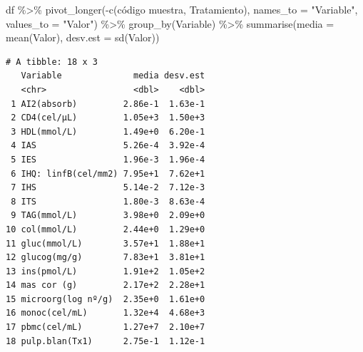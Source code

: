 \documentclass[
  a4paper,
]{scrreport}
\newenvironment{Shaded}{\begin{snugshade}}{\end{snugshade}}
\newcommand{\AttributeTok}[1]{\textcolor[rgb]{0.40,0.45,0.13}{#1}}
\newcommand{\FunctionTok}[1]{\textcolor[rgb]{0.28,0.35,0.67}{#1}}
\newcommand{\NormalTok}[1]{\textcolor[rgb]{0.00,0.23,0.31}{#1}}
\newcommand{\SpecialCharTok}[1]{\textcolor[rgb]{0.37,0.37,0.37}{#1}}
\newcommand{\StringTok}[1]{\textcolor[rgb]{0.13,0.47,0.30}{#1}}
\theoremstyle{definition}
\theoremstyle{definition}
\theoremstyle{remark}
\begin{document}
\begin{tcolorbox}[enhanced jigsaw, colbacktitle=quarto-callout-note-color!10!white, breakable, opacitybacktitle=0.6, left=2mm, opacityback=0, leftrule=.75mm, colframe=quarto-callout-note-color-frame, bottomrule=.15mm, toprule=.15mm, toptitle=1mm, colback=white, titlerule=0mm, title=\textcolor{quarto-callout-note-color}{\faInfo}\hspace{0.5em}{Solución}, rightrule=.15mm, arc=.35mm, bottomtitle=1mm, coltitle=black]

\begin{Shaded}
\begin{Highlighting}[]
\NormalTok{df }\SpecialCharTok{\%\textgreater{}\%}
    \FunctionTok{pivot\_longer}\NormalTok{(}\SpecialCharTok{{-}}\FunctionTok{c}\NormalTok{(}\StringTok{\textasciigrave{}}\AttributeTok{código muestra}\StringTok{\textasciigrave{}}\NormalTok{, Tratamiento), }\AttributeTok{names\_to =} \StringTok{"Variable"}\NormalTok{, }\AttributeTok{values\_to =} \StringTok{"Valor"}\NormalTok{) }\SpecialCharTok{\%\textgreater{}\%}
    \FunctionTok{group\_by}\NormalTok{(Variable) }\SpecialCharTok{\%\textgreater{}\%}
    \FunctionTok{summarise}\NormalTok{(}\AttributeTok{media =} \FunctionTok{mean}\NormalTok{(Valor), }\AttributeTok{desv.est =} \FunctionTok{sd}\NormalTok{(Valor))}
\end{Highlighting}
\end{Shaded}

\begin{verbatim}
# A tibble: 18 x 3
   Variable              media desv.est
   <chr>                 <dbl>    <dbl>
 1 AI2(absorb)         2.86e-1  1.63e-1
 2 CD4(cel/µL)         1.05e+3  1.50e+3
 3 HDL(mmol/L)         1.49e+0  6.20e-1
 4 IAS                 5.26e-4  3.92e-4
 5 IES                 1.96e-3  1.96e-4
 6 IHQ: linfB(cel/mm2) 7.95e+1  7.62e+1
 7 IHS                 5.14e-2  7.12e-3
 8 ITS                 1.80e-3  8.63e-4
 9 TAG(mmol/L)         3.98e+0  2.09e+0
10 col(mmol/L)         2.44e+0  1.29e+0
11 gluc(mmol/L)        3.57e+1  1.88e+1
12 glucog(mg/g)        7.83e+1  3.81e+1
13 ins(pmol/L)         1.91e+2  1.05e+2
14 mas cor (g)         2.17e+2  2.28e+1
15 microorg(log nº/g)  2.35e+0  1.61e+0
16 monoc(cel/mL)       1.32e+4  4.68e+3
17 pbmc(cel/mL)        1.27e+7  2.10e+7
18 pulp.blan(Tx1)      2.75e-1  1.12e-1
\end{verbatim}

\end{tcolorbox}

\end{document}
